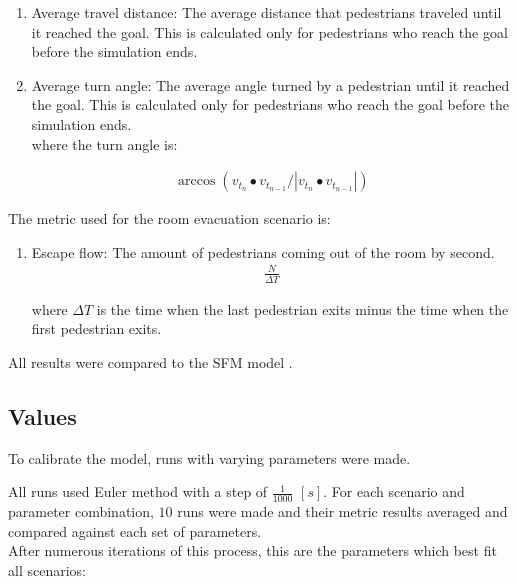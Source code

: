 \documentclass[english]{article}
\begin{document}
\begin{enumerate}
            \item Average travel distance: The average distance that pedestrians traveled
            until it reached the goal. This is calculated only for pedestrians who reach the goal
            before the simulation ends.
             
            \item Average turn angle: The average angle turned by a pedestrian until
            it reached the goal. This is calculated only for pedestrians who reach the goal
            before the simulation ends.\\
            where the turn angle is:
             
            \begin{eqnarray*}
                \arccos(v_{t_{n}}\bullet v_{t_{n-1}}/|v_{t_{n}}\bullet v_{t_{n-1}}|)
            \end{eqnarray*}
            
        \end{enumerate}
        
        The metric used for the room evacuation scenario is:
        
        \begin{enumerate}
            \item Escape flow: The amount of pedestrians coming out of the room by second.
            \begin{eqnarray*}
                \frac{N}{\Delta T}
            \end{eqnarray*}
            
            where $\Delta T$ is the time when the last pedestrian exits minus
            the time when the first pedestrian exits.
        
        \end{enumerate}
    
        All results were compared to the SFM model \cite{key-helb2000}.

    \subsection{Values}

        To calibrate the model, runs with varying parameters were made.

        All runs used Euler method with a step of $\frac{1}{1000}$ $[s]$. For each scenario 
        and parameter combination, $10$ runs were made 
        and their metric results averaged and compared against each set of parameters. \\
        After numerous iterations of this process, this are the parameters which best fit all scenarios:
        
\end{document}
